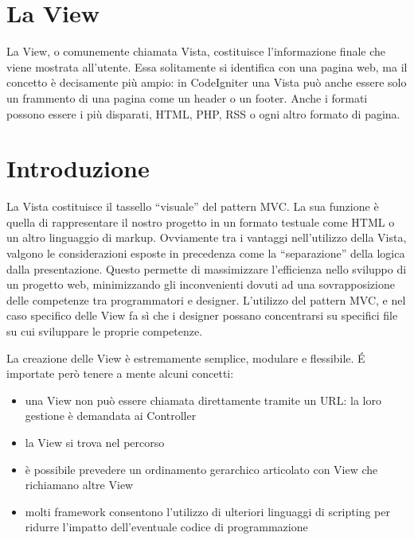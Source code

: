 \section{La View}
\label{cap:view}

La View, o comunemente chiamata Vista, costituisce l'informazione finale che viene mostrata all'utente. Essa solitamente si identifica con una pagina web, ma il concetto è decisamente più ampio: in CodeIgniter una Vista può anche essere solo un frammento di una pagina come un header o un footer. Anche i formati possono essere i più disparati, \ac{HTML}, \ac{PHP}, \ac{RSS} o ogni altro formato di pagina.

\section*{Introduzione}
La Vista costituisce il tassello ``visuale'' del pattern \ac{MVC}. La sua funzione è quella di rappresentare il nostro progetto in un formato testuale come \ac{HTML} o un altro linguaggio di markup. Ovviamente tra i vantaggi nell'utilizzo della Vista, valgono le considerazioni esposte in precedenza come la ``separazione'' della logica dalla presentazione. Questo permette di massimizzare l'efficienza nello sviluppo di un progetto web, minimizzando gli inconvenienti dovuti ad una sovrapposizione delle competenze tra programmatori e designer. L'utilizzo del pattern \ac{MVC}, e nel caso specifico delle View fa sì che i designer possano concentrarsi su specifici file su cui sviluppare le proprie competenze.

La creazione delle View è estremamente semplice, modulare e flessibile. \'E importate però tenere a mente alcuni concetti:

\begin{itemize}
\item una View non può essere chiamata direttamente tramite un \ac{URL}: la loro gestione è demandata ai Controller
\item la View si trova nel percorso 
\item è possibile prevedere un ordinamento gerarchico articolato con View che richiamano altre View
\item molti framework consentono l'utilizzo di ulteriori linguaggi di scripting per ridurre l'impatto dell'eventuale codice di programmazione
\end{itemize}

